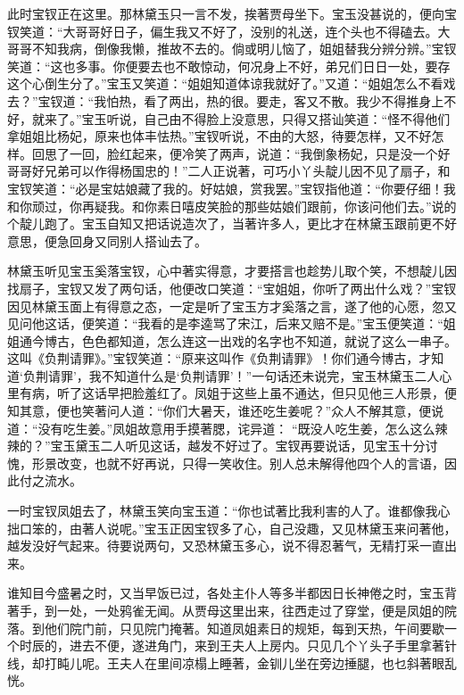 \begin{parag}
    此时宝钗正在这里。那林黛玉只一言不发，挨著贾母坐下。宝玉没甚说的，便向宝钗笑道：“大哥哥好日子，偏生我又不好了，没别的礼送，连个头也不得磕去。大哥哥不知我病，倒像我懒，推故不去的。倘或明儿恼了，姐姐替我分辨分辨。”宝钗笑道：“这也多事。你便要去也不敢惊动，何况身上不好，弟兄们日日一处，要存这个心倒生分了。”宝玉又笑道：“姐姐知道体谅我就好了。”又道：“姐姐怎么不看戏去？”宝钗道：“我怕热，看了两出，热的很。要走，客又不散。我少不得推身上不好，就来了。”宝玉听说，自己由不得脸上没意思，只得又搭讪笑道：“怪不得他们拿姐姐比杨妃，原来也体丰怯热。”宝钗听说，不由的大怒，待要怎样，又不好怎样。回思了一回，脸红起来，便冷笑了两声，说道：“我倒象杨妃，只是没一个好哥哥好兄弟可以作得杨国忠的！”二人正说著，可巧小丫头靛儿因不见了扇子，和宝钗笑道：“必是宝姑娘藏了我的。好姑娘，赏我罢。”宝钗指他道：“你要仔细！我和你顽过，你再疑我。和你素日嘻皮笑脸的那些姑娘们跟前，你该问他们去。”说的个靛儿跑了。宝玉自知又把话说造次了，当著许多人，更比才在林黛玉跟前更不好意思，便急回身又同别人搭讪去了。
\end{parag}


\begin{parag}
    林黛玉听见宝玉奚落宝钗，心中著实得意，才要搭言也趁势儿取个笑，不想靛儿因找扇子，宝钗又发了两句话，他便改口笑道：“宝姐姐，你听了两出什么戏？”宝钗因见林黛玉面上有得意之态，一定是听了宝玉方才奚落之言，遂了他的心愿，忽又见问他这话，便笑道：“我看的是李逵骂了宋江，后来又赔不是。”宝玉便笑道：“姐姐通今博古，色色都知道，怎么连这一出戏的名字也不知道，就说了这么一串子。这叫《负荆请罪》。”宝钗笑道：“原来这叫作《负荆请罪》！你们通今博古，才知道‘负荆请罪’，我不知道什么是‘负荆请罪’！”一句话还未说完，宝玉林黛玉二人心里有病，听了这话早把脸羞红了。凤姐于这些上虽不通达，但只见他三人形景，便知其意，便也笑著问人道：“你们大暑天，谁还吃生姜呢？”众人不解其意，便说道：“没有吃生姜。”凤姐故意用手摸著腮，诧异道： “既没人吃生姜，怎么这么辣辣的？”宝玉黛玉二人听见这话，越发不好过了。宝钗再要说话，见宝玉十分讨愧，形景改变，也就不好再说，只得一笑收住。别人总未解得他四个人的言语，因此付之流水。
\end{parag}


\begin{parag}
    一时宝钗凤姐去了，林黛玉笑向宝玉道：“你也试著比我利害的人了。谁都像我心拙口笨的，由著人说呢。”宝玉正因宝钗多了心，自己没趣，又见林黛玉来问著他，越发没好气起来。待要说两句，又恐林黛玉多心，说不得忍著气，无精打采一直出来。
\end{parag}


\begin{parag}
    谁知目今盛暑之时，又当早饭已过，各处主仆人等多半都因日长神倦之时，宝玉背著手，到一处，一处鸦雀无闻。从贾母这里出来，往西走过了穿堂，便是凤姐的院落。到他们院门前，只见院门掩著。知道凤姐素日的规矩，每到天热，午间要歇一个时辰的，进去不便，遂进角门，来到王夫人上房内。只见几个丫头子手里拿著针线，却打盹儿呢。王夫人在里间凉榻上睡著，金钏儿坐在旁边捶腿，也乜斜著眼乱恍。
\end{parag}


